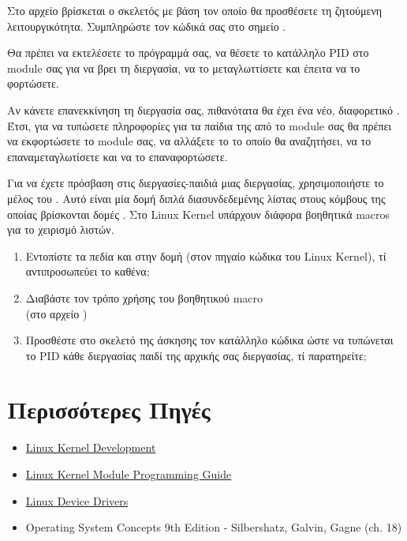\documentclass[18pt]{extarticle}
\begin{document}
\begin{question}
    Στο αρχείο  βρίσκεται ο σκελετός με βάση τον οποίο θα προσθέσετε τη ζητούμενη λειτουργικότητα.
    Συμπληρώστε τον κώδικά σας στο σημείο .

    Θα πρέπει να εκτελέσετε το πρόγραμμά σας, να θέσετε το κατάλληλο PID στο module σας για να βρει τη διεργασία, να το μεταγλωττίσετε και έπειτα να το φορτώσετε.

\begin{warn}[Προσοχή]
    Αν κάνετε επανεκκίνηση τη διεργασία σας, πιθανότατα θα έχει ένα νέο, διαφορετικό .
    Έτσι, για να τυπώσετε πληροφορίες για τα παίδια της από το module σας θα πρέπει να εκφορτώσετε το module σας, να αλλάξετε το  το οποίο θα αναζητήσει, 
    να το επαναμεταγλωτίσετε και να το επαναφορτώσετε.
\end{warn}

    Για να έχετε πρόσβαση στις διεργασίες-παιδιά μιας διεργασίας, χρησιμοποιήστε το μέλος  του .
    Αυτό είναι μία δομή διπλά διασυνδεδεμένης λίστας στους κόμβους της οποίας βρίσκονται δομές .
    Στο Linux Kernel υπάρχουν διάφορα βοηθητικά macros για το χειρισμό λιστών.

    \begin{enumerate}
        \item Εντοπίστε τα πεδία  και  στην δομή  (στον πηγαίο κώδικα του Linux Kernel), τί αντιπροσωπεύει το καθένα;
        \item Διαβάστε τον τρόπο χρήσης του βοηθητικού macro \\
            (στο αρχείο )
        \item Προσθέστε στο σκελετό της άσκησης τον κατάλληλο κώδικα ώστε να τυπώνεται το PID κάθε διεργασίας παιδί της αρχικής σας διεργασίας, τί παρατηρείτε;    
    \end{enumerate}
    
\end{question}
    
\newpage

\section*{Περισσότερες Πηγές}

\begin{itemize}
    \item \href{https://www.doc-developpement-durable.org/file/Projets-informatiques/cours-&-manuels-informatiques/Linux/Linux\%20Kernel\%20Development,\%203rd\%20Edition.pdf}{Linux Kernel Development}
    \item \href{https://sysprog21.github.io/lkmpg/}{Linux Kernel Module Programming Guide}
    \item \href{https://lwn.net/Kernel/LDD3/}{Linux Device Drivers}
    \item Operating System Concepts 9th Edition - Silbershatz, Galvin, Gagne (ch. 18)
\end{itemize}
\end{document}
